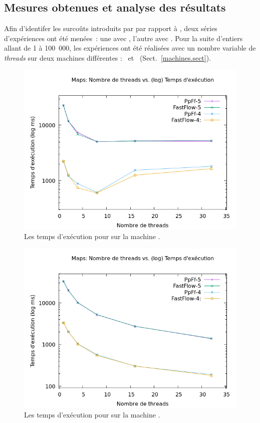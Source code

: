\subsection{Mesures obtenues et analyse des r\'esultats}

Afin d'identifer les surco\^uts introduits par \PpFf{} par rapport \`a , deux s\'eries d'exp\'eriences ont \'et\'e men\'ees~: une avec , l'autre avec . Pour la suite d'entiers allant de 1 \`a 100~000, les exp\'eriences ont \'et\'e r\'ealis\'ees avec un nombre variable de \emph{threads} sur deux machines diff\'erentes : \ et \ (Sect.~\ref{machines.sect}).  


\begin{figure}[H]
\centering
     \includegraphics[width=1.0\textwidth]{Figures/graphe_temps_Java_Maps.png}
      \caption{Les temps d'ex\'ecution pour  sur la machine .}
       \label{GrapheTempsMapsJava.fig}
\end{figure}

\begin{figure}[H]
\centering
     \includegraphics[width=1.0\textwidth]{Figures/graphe_temps_Japet_Maps.png}
      \caption{Les temps d'ex\'ecution pour  sur la machine .}
       \label{GrapheTempsMapstJapet.fig}
\end{figure}


